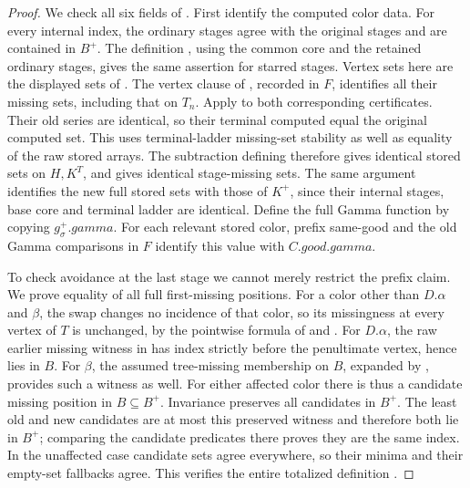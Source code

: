 \begin{proof}
We check all six fields of . First identify the
computed color data. For every internal index, the ordinary stages agree
with the original stages and are contained in $B^+$. The definition
, using the common core and the retained
ordinary stages, gives the same assertion for starred stages. Vertex
sets here are the displayed sets of . The
vertex clause of , recorded in $F$,
identifies all their missing sets, including that on $T_n$.
Apply  to both corresponding
certificates. Their old series are identical, so their terminal computed
 equal the original computed set. This
uses terminal-ladder missing-set stability as well as equality of the
raw stored arrays. The subtraction defining
 therefore gives identical stored sets
on $H,K^T$, and  gives identical
stage-missing sets. The same argument identifies the new full stored
sets with those of $K^+$, since their internal stages, base core and
terminal ladder are identical. Define the full Gamma function by copying
$g^+_\sigma.\mathit{gamma}$. For each relevant stored color, prefix
same-good and the old Gamma comparisons in $F$ identify this value with
$C.\mathit{good}.\mathit{gamma}$.

To check avoidance at the last stage we cannot merely restrict the prefix
claim. We prove equality of all full first-missing positions. For a color
other than $D.\alpha$ and $\beta$, the swap changes no incidence of that
color, so its missingness at every vertex of $T$ is unchanged, by the
pointwise formula of  and
. For $D.\alpha$, the raw earlier missing witness
in  has index strictly before
the penultimate vertex, hence lies in $B$. For $\beta$, the assumed
tree-missing membership on $B$, expanded by ,
provides such a witness as well. For either affected color there is thus
a candidate missing position in $B\subseteq B^+$. Invariance preserves
all candidates in $B^+$. The least old and new candidates are at most
this preserved witness and therefore both lie in $B^+$; comparing the
candidate predicates there proves they are the same index. In the
unaffected case candidate sets agree everywhere, so their minima and their
empty-set fallbacks agree. This verifies the entire totalized definition
.


\end{proof}
